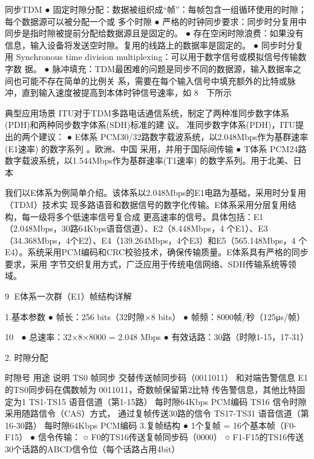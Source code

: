 同步TDM
 ● 固定时隙分配：数据被组织成“帧”：每帧包含一组循环使用的时隙；每个数据源可以被分配一个或
   多个时隙
 ● 严格的时钟同步要求：同步时分复用中同步是指时隙被提前分配给数据源且是固定的。
 ● 存在空闲时隙浪费：如果没有信息，输入设备将发送空时隙。复用的线路上的数据率是固定的。
 ● 同步时分复用 Synchronous time division multiplexing：可以用于数字信号或模拟信号传输数字数
   据。
 ● 脉冲填充：TDM最困难的问题是同步不同的数据源，输入数据率之间也可能不存在简单的比例关
   系，需要在每个输入信号中填充额外的比特或脉冲，直到输入速度被提高到本体时钟信号速率，如
                                                                  8
  下所示




典型应用场景
ITU对于TDM多路电话通信系统，制定了两种准同步数字体系(PDH)和两种同步数字体系(SDH)标准的建
议。
准同步数字体系(PDH)，ITU提出的两个建议：
  ● E体系 PCM30/32路数字载波系统，以2.048Mbps作为基群速率(E1速率) 的数字系列 。欧洲、中国
    采用，并用于国际间传输
  ● T体系 PCM24路数字载波系统，以1.544Mbps作为基群速率(T1速率) 的数字系列。用于北美、日本

我们以E体系为例简单介绍。该体系以2.048Mbps的E1电路为基础，采用时分复用（TDM）技术实
现多路语音和数据信号的数字化传输。E体系采用分层复用结构，每一级将多个低速率信号复合成
更高速率的信号。具体包括：E1（2.048Mbps，30路64Kbps语音信道）、E2（8.448Mbps，4
个E1）、E3（34.368Mbps，4个E2）、E4（139.264Mbps，4个E3）和E5（565.148Mbps，4
个E4）。系统采用PCM编码和CRC校验技术，确保传输质量。E体系具有严格的同步要求，采用
字节交织复用方式，广泛应用于传统电信网络、SDH传输系统等领域。

                                                             9
E体系一次群（E1）帧结构详解




1.基本参数
● 帧长：256 bits（32时隙×8 bits）
● 帧频：8000帧/秒（125μs/帧）


                             10
 ● 总速率：32×8×8000 = 2.048 Mbps
● 有效话路：30路（时隙1-15，17-31）

2. 时隙分配

时隙号                      用途                说明
TS0                      帧同步               交替传送帧同步码（0011011）
                                           和对端告警信息
                                           E1的TS0同步码在偶数帧为
                                           0011011，奇数帧保留第2比特
                                           传告警信息，其他比特固定为1
TS1-TS15                语音信道（第1-15路）       每时隙64Kbps PCM编码
TS16                    信令时隙               采用随路信令（CAS）方式，
                                           通过复帧传送30路的信令
TS17-TS31               语音信道（第16-30路）      每时隙64Kbps PCM编码
 3.复帧结构
 ● 1个复帧 = 16个基本帧（F0-F15）
 ● 信令传输：
    ○ F0的TS16传送复帧同步码（0000）
    ○ F1-F15的TS16传送30个话路的ABCD信令位（每个话路占用4bit）


